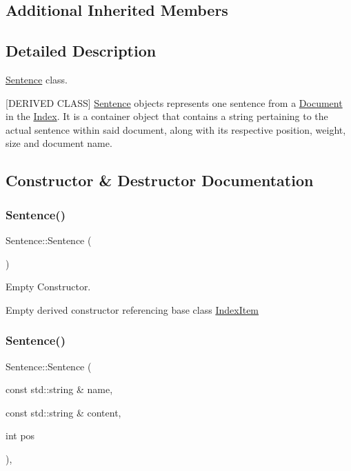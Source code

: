 \subsection*{Additional Inherited Members}


\subsection{Detailed Description}
\hyperlink{class_sentence}{Sentence} class. 

\mbox{[}D\+E\+R\+I\+V\+ED C\+L\+A\+SS\mbox{]} \hyperlink{class_sentence}{Sentence} objects represents one sentence from a \hyperlink{class_document}{Document} in the \hyperlink{class_index}{Index}. It is a container object that contains a string pertaining to the actual sentence within said document, along with its respective position, weight, size and document name. 

\subsection{Constructor \& Destructor Documentation}
\mbox{\label{class_sentence_aa767c3de8aaf7f2e30fa7524cdfcaead}} 
\subsubsection{\texorpdfstring{Sentence()}{Sentence()}\hspace{0.1cm}{\footnotesize\ttfamily [1/2]}}
{\footnotesize\ttfamily Sentence\+::\+Sentence (\begin{DoxyParamCaption}{ }\end{DoxyParamCaption})\hspace{0.3cm}{\ttfamily [inline]}}



Empty Constructor. 

Empty derived constructor referencing base class \hyperlink{class_index_item}{Index\+Item} \mbox{\label{class_sentence_af493870ce2b1718f57a979319af9e7a7}} 
\subsubsection{\texorpdfstring{Sentence()}{Sentence()}\hspace{0.1cm}{\footnotesize\ttfamily [2/2]}}
{\footnotesize\ttfamily Sentence\+::\+Sentence (\begin{DoxyParamCaption}\item[{const std\+::string \&}]{name,  }\item[{const std\+::string \&}]{content,  }\item[{int}]{pos }\end{DoxyParamCaption})\hspace{0.3cm}{\ttfamily [inline]}, {\ttfamily [explicit]}}



